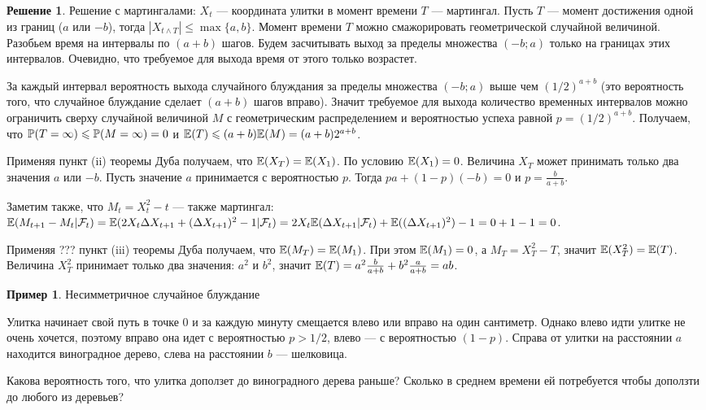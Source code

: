 \documentclass[pdftex,12pt,a4paper]{article}
\numberwithin{equation}{page} %
\theoremstyle{definition} %
\theoremstyle{definition}
\newtheorem{example}[equation]{Пример}
\theoremstyle{definition}
\newtheorem*{solution}{Решение}
\theoremstyle{definition}
\begin{document}
\begin{solution}
Решение с мартингалами: $X_{t}$ --- координата улитки в момент времени $T$ --- мартингал. Пусть $T$ --- момент достижения одной из границ ($a$ или $-b$), тогда $|X_{t\wedge T}|\leq \max\{a,b\}$. Момент времени $T$ можно смажорировать геометрической случайной величиной. Разобьем время на интервалы по $(a+b)$ шагов. Будем засчитывать выход за пределы множества $(-b;a)$ только на границах этих интервалов. Очевидно, что требуемое для выхода время от этого только возрастет. 

За каждый интервал вероятность выхода случайного блуждания за пределы множества $(-b;a)$ выше чем $(1/2)^{a+b}$ (это вероятность того, что случайное блуждание сделает $(a+b)$ шагов вправо). Значит требуемое для выхода количество временных интервалов можно ограничить сверху случайной величиной $M$ с геометрическим распределением и вероятностью успеха равной $p=(1/2)^{a+b}$. Получаем, что $\P(T=\infty)\leq \P(M=\infty)=0$ и $\E(T)\leq (a+b) \E(M)=(a+b) 2^{a+b}$.

Применяя пункт (ii) теоремы Дуба получаем, что $\E(X_{T})=\E(X_{1})$. По условию $\E(X_{1})=0$. Величина $X_{T}$ может принимать только два значения $a$ или $-b$. Пусть значение $a$ принимается с вероятностью $p$. Тогда $pa+(1-p)(-b)=0$ и $p=\frac{b}{a+b}$.

Заметим также, что $M_{t}=X^{2}_{t}-t$ --- также мартингал: $\E(M_{t+1}-M_{t}|\mathcal{F}_{t})=\E(2X_{t}\Delta X_{t+1}+(\Delta X_{t+1})^{2}-1|\mathcal{F}_{t})=2X_{t}\E(\Delta X_{t+1}|\mathcal{F}_{t})+\E((\Delta X_{t+1})^{2})-1=0+1-1=0$. 

Применяя ??? пункт (iii) теоремы Дуба получаем, что $\E(M_{T})=\E(M_{1})$. При этом $\E(M_{1})=0$, а $M_{T}=X_{T}^{2}-T$, значит $\E(X_{T}^{2})=\E(T)$. Величина $X_{T}^{2}$ принимает только два значения: $a^{2}$ и $b^{2}$, значит $\E(T)=a^2\frac{b}{a+b}+b^2\frac{a}{a+b}=ab$.
\end{solution}

\begin{example} Несимметричное случайное блуждание 

Улитка начинает свой путь в точке 0 и за каждую минуту смещается влево или вправо на один сантиметр. Однако влево идти улитке не очень хочется, поэтому вправо она идет с вероятностью $p>1/2$, влево --- с вероятностью $(1-p)$. Справа от улитки на расстоянии $a$ находится виноградное дерево, слева на расстоянии $b$ --- шелковица.

Какова вероятность того, что улитка доползет до виноградного дерева раньше? Сколько в среднем времени ей потребуется чтобы доползти до любого из деревьев?
\end{example}
\end{document}
